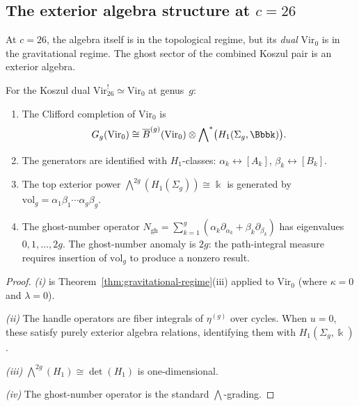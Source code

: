 \subsection{The exterior algebra structure at $c = 26$}
\label{subsec:exterior-c26}

At $c = 26$, the algebra itself is in the topological regime, but its
\emph{dual} $\mathrm{Vir}_0$ is in the gravitational regime. The ghost
sector of the combined Koszul pair is an exterior algebra.

\begin{theorem}[Ghost sector at $c = 26$; \ClaimStatusProvedHere]
\label{thm:ghost-sector-c26}
For the Koszul dual $\mathrm{Vir}_{26}^! \simeq \mathrm{Vir}_0$
at genus~$g$:
\begin{enumerate}[label=\textup{(\roman*)}]
\item The Clifford completion of $\mathrm{Vir}_0$ is
\begin{equation}\label{eq:g9-ghost-sector}
G_g(\mathrm{Vir}_0)
\cong \barB^{(g)}(\mathrm{Vir}_0) \otimes
\bigwedge\nolimits^*\bigl(H_1(\Sigma_g, \Bbbk)\bigr).
\end{equation}

\item The generators are identified with $H_1$-classes:
$\alpha_k \leftrightarrow [A_k]$, $\beta_k \leftrightarrow [B_k]$.

\item The top exterior power
$\bigwedge^{2g}(H_1(\Sigma_g)) \cong \Bbbk$ is generated by
$\mathrm{vol}_g = \alpha_1\beta_1 \cdots \alpha_g\beta_g$.

\item The ghost-number operator
$N_{\mathrm{gh}} = \sum_{k=1}^g(\alpha_k\partial_{\alpha_k} +
\beta_k\partial_{\beta_k})$ has eigenvalues $0, 1, \ldots, 2g$.
The ghost-number anomaly is $2g$: the path-integral measure requires
insertion of $\mathrm{vol}_g$ to produce a nonzero result.
\end{enumerate}
\end{theorem}

\begin{proof}
\emph{(i)} is Theorem~\ref{thm:gravitational-regime}(iii) applied to
$\mathrm{Vir}_0$ (where $\kappa = 0$ and $\lambda = 0$).

\emph{(ii)} The handle operators are fiber integrals of $\eta^{(g)}$
over cycles. When $u = 0$, these satisfy purely exterior algebra
relations, identifying them with $H_1(\Sigma_g, \Bbbk)$.

\emph{(iii)} $\bigwedge^{2g}(H_1) \cong \det(H_1)$ is one-dimensional.

\emph{(iv)} The ghost-number operator is the standard
$\bigwedge$-grading.
\end{proof}

